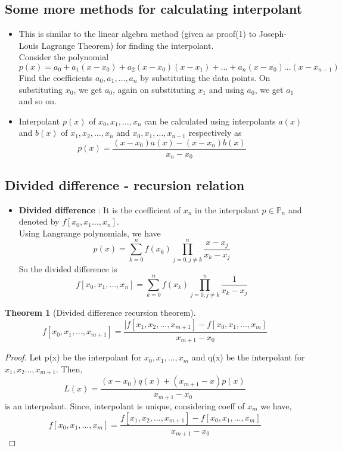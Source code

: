 \documentclass{article}
\newtheorem*{theorem}{Theorem}
\begin{document}
\subsection{Some more methods for calculating interpolant}
	\begin{itemize}
		\item This is similar to the linear algebra method (given as proof(1) to Joseph-Louis Lagrange Theorem) for finding the interpolant.\\
		Consider the polynomial 
		\[p(x)= a_0 +a_1 (x-x_0) + a_2(x-x_0)(x-x_1)+ \hdots +a_n(x-x_0)...(x-x_{n-1})\]
		Find the coefficients $a_0, a_1, \hdots, a_n$ by substituting the data points. On substituting $x_0$, we get $a_0$, again on substituting $x_1$ and using $a_0$, we get $a_1$ and so on.

		\item Interpolant $p(x)$ of  $x_0,x_1,\hdots,x_n$ can be calculated using interpolants $a(x)$ and $b(x)$ of $x_1,x_2,\hdots,x_n$ and $x_0,x_1,\hdots,x_{n-1}$ respectively as 
			\[p(x)=\frac{(x-x_0)a(x)-(x-x_n)b(x)}{x_n-x_0}\]
	\end{itemize}

\subsection{Divided difference - recursion relation}
	\begin{itemize}
		\item \textbf{Divided difference} : It is the coefficient of $x_n$ in the interpolant $p \in \mathbb{P}_n$ and denoted by $f[x_0,x_1\hdots,x_n]$.\\
		Using Langrange polynomials, we have
		\[p(x)=\sum_{k=0}^n f(x_k) \prod_{j=0, j\neq k}^n \frac{x-x_j}{x_k-x_j}\]
		So the divided difference is
		\[f[x_0,x_1,\hdots,x_n]=\sum_{k=0}^n f(x_k) \prod_{j=0, j\neq k}^n \frac{1}{x_k-x_j}\]

	\end{itemize}

	\begin{theorem}[Divided difference recursion theorem]
		\[\boxed{f[x_0,x_1,\hdots,x_{m+1}] = \frac{[f[x_1, x_2,\hdots,x_{m+1}] - f[x_0,x_1,\hdots,x_{m}]}{x_{m+1}-x_0}}\]
	\end{theorem}
	\begin{proof}
		Let p(x) be the interpolant for $x_0,x_1,\hdots,x_m$ and q(x) be the interpolant for $x_1,x_2\hdots,x_{m+1}$. Then,
		\[L(x)= \frac{(x-x_0)q(x)+(x_{m+1}-x)p(x)}{x_{m+1}-x_0}\] is an interpolant.
		Since, interpolant is unique, considering coeff of $x_{m}$ we have,
		\[f[x_0,x_1,\hdots, x_m]=  \frac{f[x_1, x_2,\hdots,x_{m+1}] - f[x_0,x_1,\hdots,x_{m}]}{x_{m+1}-x_0}\]
	\end{proof}
\end{document}

